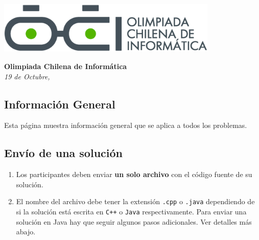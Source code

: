 \documentclass[12pt]{oci}
\begin{document}
  \begin{center}
  \includegraphics[height=70pt]{logo.eps}

  \vskip 70pt
  \Large{\bf Olimpiada Chilena de Inform\'atica\\ \the\year}
  \vskip 10pt
  \large{\phase}
  \vskip 10pt
  \normalsize{\it 19 de Octubre, \the\year}

  \vskip 85pt

\end{center} %

\cleardoublepage


\subsection*{Información General}

Esta página muestra información general que se aplica a todos los problemas.

\subsection*{Envío de una solución}

\begin{enumerate}
\item Los participantes deben enviar {\bf un solo archivo} con el código fuente de su solución.
\item El nombre del archivo debe tener la extensión \verb+.cpp+ o
  \verb+.java+ dependiendo de si la solución está escrita en
  \verb|C++| o \verb|Java| respectivamente.
Para enviar una solución en Java hay que seguir algunos pasos adicionales. Ver detalles más abajo.
\end{enumerate}
\end{document}
